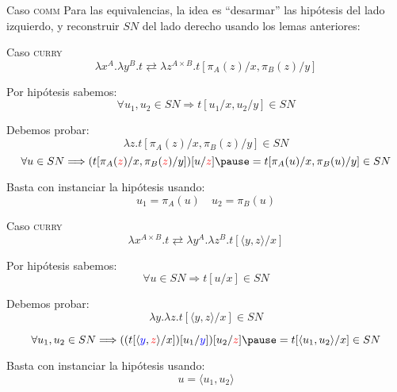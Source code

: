 \begin{frame}{Caso \textsc{comm}}
	Para las equivalencias, la idea es ``desarmar'' las hipótesis del lado izquierdo, y reconstruir $SN$ del lado derecho usando los lemas anteriores:
\end{frame}

\begin{frame}{Caso \textsc{curry}}
	\[ \lambda x^A. \lambda y^B. t \rightleftarrows \lambda z^{A \times B}. t[\pi_A(z)/x, \pi_B(z)/y] \]
	\pause
	
	Por hipótesis sabemos:
	\[ \forall u_1, u_2 \in SN \Longrightarrow t[u_1/x, u_2/y] \in SN \]
	\pause
	
	Debemos probar:
	\[ \lambda z. t[\pi_A(z)/x, \pi_B(z)/y] \in SN \]
	\pause
	\[ \forall u \in SN \Longrightarrow (t[\pi_A(\textcolor{red}{z})/x, \pi_B(\textcolor{red}{z})/y])[u/\textcolor{red}{z}] \pause = t[\pi_A(u)/x, \pi_B(u)/y] \in SN \]
	 
	\pause
	Basta con instanciar la hipótesis usando:
	\[ u_1 = \pi_A(u) \quad u_2 = \pi_B(u) \]
\end{frame}

\begin{frame}{Caso \textsc{curry}}
	\[ \lambda x^{A \times B}. t \rightleftarrows \lambda y^A. \lambda z^B. t[\langle y, z \rangle/x] \]
	\pause
	
	Por hipótesis sabemos:
	\[ \forall u \in SN \Longrightarrow t[u/x] \in SN \]
	\pause
	
	Debemos probar:
	\[ \lambda y. \lambda z. t[\langle y, z \rangle/x] \in SN \]
	
	\pause
	\[ \forall u_1,u_2 \in SN \Longrightarrow ((t[\langle \textcolor{blue}{y}, \textcolor{red}{z} \rangle/x])[u_1/\textcolor{blue}{y}])[u_2/\textcolor{red}{z}] \pause = t[\langle u_1, u_2 \rangle/x] \in SN \]

	\pause
	Basta con instanciar la hipótesis usando:
	\[ u = \langle u_1, u_2 \rangle \]
\end{frame}
